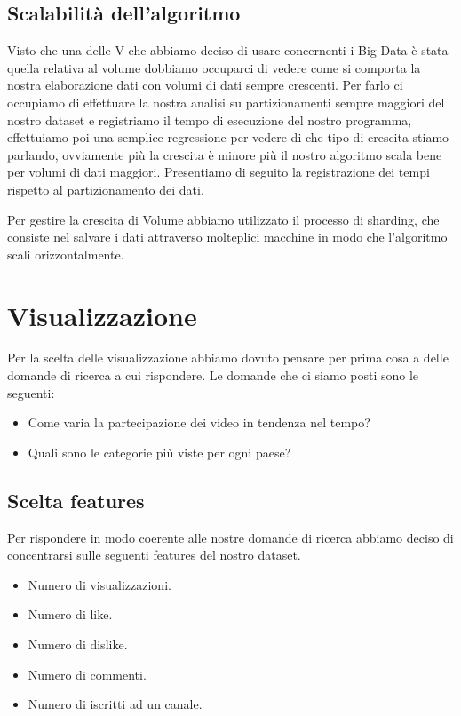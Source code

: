 \documentclass[10pt, a4paper,openany]{article}
\begin{document}
\begin{multicols}{2}
\begin{itemize}
\end{itemize}

\subsection*{Scalabilità dell'algoritmo}

Visto che una delle V che abbiamo deciso di usare concernenti i Big Data è stata quella relativa al volume dobbiamo occuparci di vedere come si comporta la nostra elaborazione dati con volumi di dati sempre crescenti. Per farlo ci occupiamo di effettuare la nostra analisi su partizionamenti sempre maggiori del nostro dataset e registriamo il tempo di esecuzione del nostro programma, effettuiamo poi una semplice regressione per vedere di che tipo di crescita stiamo parlando, ovviamente più la crescita è minore più il nostro algoritmo scala bene per volumi di dati maggiori. Presentiamo di seguito la registrazione dei tempi rispetto al partizionamento dei dati. 

Per gestire la crescita di Volume abbiamo utilizzato il processo di sharding, che consiste nel salvare i dati attraverso molteplici macchine in modo che l'algoritmo scali orizzontalmente.
\section*{Visualizzazione}
Per la scelta delle visualizzazione abbiamo dovuto pensare per prima cosa a delle domande di ricerca a cui rispondere. Le domande che ci siamo posti sono le seguenti:
\begin{itemize}
	\item Come varia la partecipazione dei video in tendenza nel tempo?
	\item Quali sono le categorie più viste per ogni paese?
\end{itemize}

\subsection*{Scelta features}
Per rispondere in modo coerente alle nostre domande di ricerca abbiamo deciso di concentrarsi sulle seguenti features del nostro dataset.
\begin{itemize}
	\item Numero di visualizzazioni.
	\item Numero di like.
	\item Numero di dislike.
	\item Numero di commenti.
	\item Numero di iscritti ad un canale.
\end{itemize}


\end{multicols}
\end{document}
